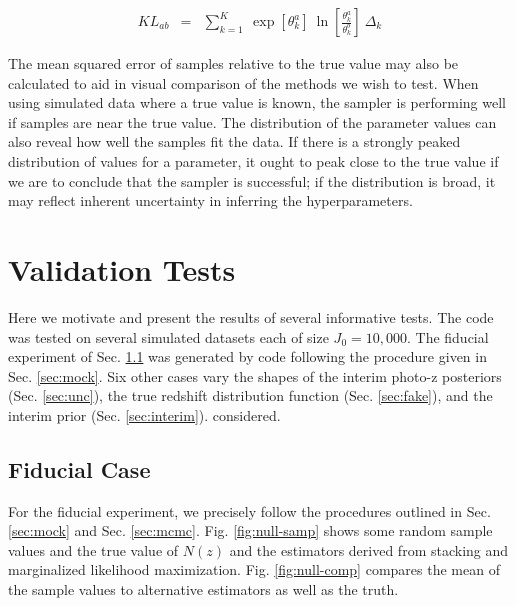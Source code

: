 \documentclass[preprint]{aastex}
\begin{document}
\begin{eqnarray}
\label{eq:kl}
KL_{ab} &=& \sum_{k=1}^{K}\ \exp[\theta_{k}^{a}]\ 
\ln\left[\frac{\theta_{k}^{a}}{\theta_{k}^{b}}\right]\ \Delta_{k}
\end{eqnarray}

The mean squared error of samples relative to the true value may also be 
calculated to aid in visual comparison of the methods we wish to test.  When 
using simulated data where a true value is known, the sampler is performing 
well if samples are near the true value.  The distribution of the parameter 
values can also reveal how well the samples fit the data.  If there is a 
strongly peaked distribution of values for a parameter, it ought to peak close 
to the true value if we are to conclude that the sampler is successful; if the 
distribution is broad, it may reflect inherent uncertainty in inferring the 
hyperparameters.

\clearpage
\section{Validation Tests}
\label{sec:valid}

Here we motivate and present the results of several informative tests.  The 
code was tested on several simulated datasets each of size $J_{0}=10,000$.  The 
fiducial experiment of Sec. \ref{sec:null} was generated by code following the 
procedure given in Sec. \ref{sec:mock}.  Six other cases vary the shapes of the 
interim photo-z posteriors (Sec. \ref{sec:unc}), the true redshift distribution 
function (Sec. \ref{sec:fake}), and the interim prior (Sec. \ref{sec:interim}). 
considered.

\clearpage
\subsection{Fiducial Case}
\label{sec:null}

For the fiducial experiment, we precisely follow the procedures outlined in 
Sec. \ref{sec:mock} and Sec. \ref{sec:mcmc}.  Fig. \ref{fig:null-samp} shows 
some random sample values and the true value of $N(z)$ and the estimators 
derived from stacking and marginalized likelihood maximization.  Fig. 
\ref{fig:null-comp} compares the mean of the sample values to alternative 
estimators as well as the truth.
\end{document}
